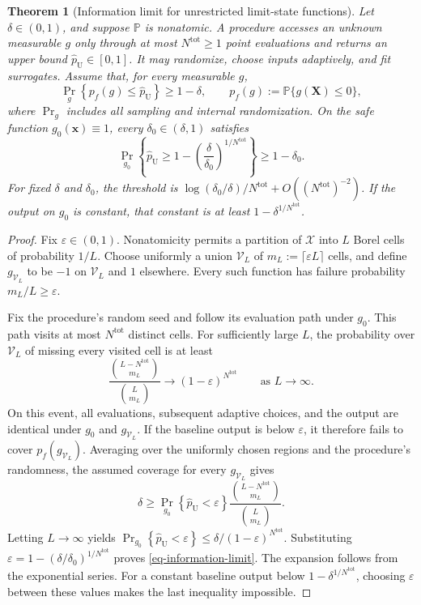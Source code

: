 \documentclass[review,11pt,3p,authoryear,nopreprintline]{elsarticle}
\newtheorem{theorem}{Theorem}
\begin{document}
\begin{theorem}[Information limit for unrestricted limit-state functions]
  \label{thm-information-limit}
  Let $\delta\in(0,1)$, and suppose $\mathbb P$ is nonatomic. A procedure accesses an unknown measurable $g$ only through at most $N^{\mathrm{tot}}\ge1$ point evaluations and returns an upper bound $\widehat p_{\mathrm U}\in[0,1]$. It may randomize, choose inputs adaptively, and fit surrogates. Assume that, for every measurable $g$,
  \[
    \Pr_g\left\{p_f(g)\le\widehat p_{\mathrm U}\right\}\ge1-\delta,
    \qquad p_f(g):=\mathbb P\{g(\bm X)\le0\},
  \]
  where $\Pr_g$ includes all sampling and internal randomization. On the safe function $g_0(\bm x)\equiv1$, every $\delta_0\in(\delta,1)$ satisfies
  \begin{equation}
    \Pr_{g_0}\left\{\widehat p_{\mathrm U}\ge
      1-\left(\frac{\delta}{\delta_0}\right)^{1/N^{\mathrm{tot}}}\right\}
      \ge1-\delta_0.
    \label{eq-information-limit}
  \end{equation}
  For fixed $\delta$ and $\delta_0$, the threshold is
  $\log(\delta_0/\delta)/N^{\mathrm{tot}}+O\left(\left(N^{\mathrm{tot}}\right)^{-2}\right)$.
  If the output on $g_0$ is constant, that constant is at least $1-\delta^{1/N^{\mathrm{tot}}}$.
\end{theorem}
\begin{proof}
  Fix $\varepsilon\in(0,1)$. Nonatomicity permits a partition of $\mathcal X$ into $L$ Borel cells of probability $1/L$. Choose uniformly a union $\mathcal V_L$ of $m_L:=\lceil\varepsilon L\rceil$ cells, and define $g_{\mathcal V_L}$ to be $-1$ on $\mathcal V_L$ and $1$ elsewhere. Every such function has failure probability $m_L/L\ge\varepsilon$.

  Fix the procedure's random seed and follow its evaluation path under $g_0$. This path visits at most $N^{\mathrm{tot}}$ distinct cells. For sufficiently large $L$, the probability over $\mathcal V_L$ of missing every visited cell is at least
  \[
    \frac{\binom{L-N^{\mathrm{tot}}}{m_L}}{\binom{L}{m_L}}
      \longrightarrow(1-\varepsilon)^{N^{\mathrm{tot}}}
      \qquad\text{as }L\to\infty.
  \]
  On this event, all evaluations, subsequent adaptive choices, and the output are identical under $g_0$ and $g_{\mathcal V_L}$. If the baseline output is below $\varepsilon$, it therefore fails to cover $p_f(g_{\mathcal V_L})$. Averaging over the uniformly chosen regions and the procedure's randomness, the assumed coverage for every $g_{\mathcal V_L}$ gives
  \[
    \delta\ge
    \Pr_{g_0}\left\{\widehat p_{\mathrm U}<\varepsilon\right\}
    \frac{\binom{L-N^{\mathrm{tot}}}{m_L}}{\binom{L}{m_L}}.
  \]
  Letting $L\to\infty$ yields
  $\Pr_{g_0}\left\{\widehat p_{\mathrm U}<\varepsilon\right\}
    \le\delta/(1-\varepsilon)^{N^{\mathrm{tot}}}$.
  Substituting $\varepsilon=1-(\delta/\delta_0)^{1/N^{\mathrm{tot}}}$ proves \eqref{eq-information-limit}. The expansion follows from the exponential series. For a constant baseline output below $1-\delta^{1/N^{\mathrm{tot}}}$, choosing $\varepsilon$ between these values makes the last inequality impossible.
\end{proof}
\end{document}
